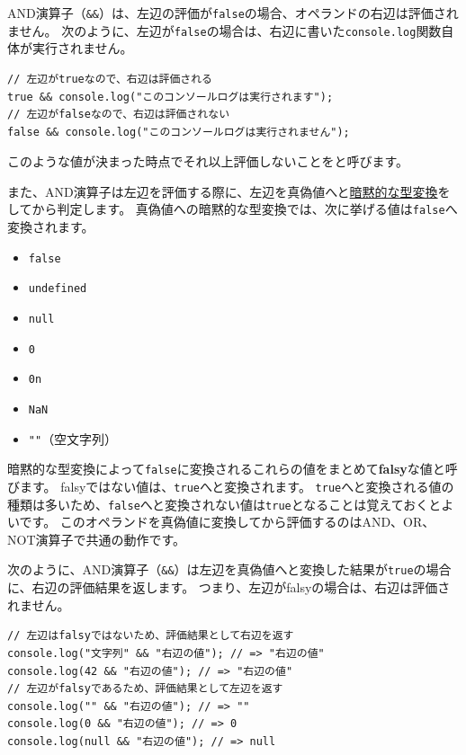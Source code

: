 AND演算子（\texttt{\&\&}）は、左辺の評価が\texttt{false}の場合、オペランドの右辺は評価されません。
次のように、左辺が\texttt{false}の場合は、右辺に書いた\texttt{console.log}関数自体が実行されません。

\begin{lstlisting}
// 左辺がtrueなので、右辺は評価される
true && console.log("このコンソールログは実行されます");
// 左辺がfalseなので、右辺は評価されない
false && console.log("このコンソールログは実行されません");
\end{lstlisting}

このような値が決まった時点でそれ以上評価しないことを\textbf{}と呼びます。

また、AND演算子は左辺を評価する際に、左辺を真偽値へと\hyperlink{implicit-coercion}{暗黙的な型変換}をしてから判定します。
真偽値への暗黙的な型変換では、次に挙げる値は\texttt{false}へ変換されます。

\begin{itemize}
\item \texttt{false}
\item \texttt{undefined}
\item \texttt{null}
\item \texttt{0}
\item \texttt{0n}
\item \texttt{NaN}
\item \texttt{""}（空文字列）
\end{itemize}

暗黙的な型変換によって\texttt{false}に変換されるこれらの値をまとめて\textbf{falsy}な値と呼びます。
falsyではない値は、\texttt{true}へと変換されます。
\texttt{true}へと変換される値の種類は多いため、\texttt{false}へと変換されない値は\texttt{true}となることは覚えておくとよいです。
このオペランドを真偽値に変換してから評価するのはAND、OR、NOT演算子で共通の動作です。

次のように、AND演算子（\texttt{\&\&}）は左辺を真偽値へと変換した結果が\texttt{true}の場合に、右辺の評価結果を返します。
つまり、左辺がfalsyの場合は、右辺は評価されません。

\begin{lstlisting}
// 左辺はfalsyではないため、評価結果として右辺を返す
console.log("文字列" && "右辺の値"); // => "右辺の値"
console.log(42 && "右辺の値"); // => "右辺の値"
// 左辺がfalsyであるため、評価結果として左辺を返す
console.log("" && "右辺の値"); // => ""
console.log(0 && "右辺の値"); // => 0
console.log(null && "右辺の値"); // => null
\end{lstlisting}

